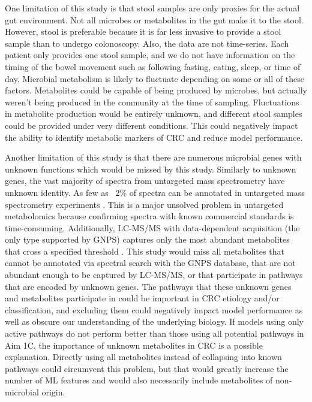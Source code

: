 \documentclass[11pt]{article}
\begin{document}
One limitation of this study is that stool samples are only proxies for the actual gut environment.
Not all microbes or metabolites in the gut make it to the stool.
However, stool is preferable because it is far less invasive to provide a stool sample than to undergo colonoscopy.
Also, the data are not time-series.
Each patient only provides one stool sample, and we do not have information on the timing of the bowel movement such as following fasting, eating, sleep, or time of day.
Microbial metabolism is likely to fluctuate depending on some or all of these factors.
Metabolites could be capable of being produced by microbes, but actually weren't being produced in the community at the time of sampling.
Fluctuations in metabolite production would be entirely unknown, and different stool samples could be provided under very different conditions.
This could negatively impact the ability to identify metabolic markers of CRC and reduce model performance.

Another limitation of this study is that there are numerous microbial genes with unknown functions which would be missed by this study.
Similarly to unknown genes, the vast majority of spectra from untargeted mass spectrometry have unknown identity.
As few as ~2\% of spectra can be annotated in untargeted mass spectrometry experiments \cite{da_silva_illuminating_2015}.
This is a major unsolved problem in untargeted metabolomics because confirming spectra with known commercial standards is time-consuming.
Additionally, LC-MS/MS with data-dependent acquisition (the only type supported by GNPS) captures only the most abundant metabolites that cross a specified threshold \cite{xiao_metabolite_2012}.
This study would miss all metabolites that cannot be annotated via spectral search with the GNPS database, that are not abundant enough to be captured by LC-MS/MS, or that participate in pathways that are encoded by unknown genes.
The pathways that these unknown genes and metabolites participate in could be important in CRC etiology and/or classification,
and excluding them could negatively impact model performance as well as obscure our understanding of the underlying biology.
If models using only active pathways do not perform better than those using all potential pathways in Aim 1C,
the importance of unknown metabolites in CRC is a possible explanation.
Directly using all metabolites instead of collapsing into known pathways could circumvent this problem,
but that would greatly increase the number of ML features and would also necessarily include metabolites of non-microbial origin.
\end{document}
